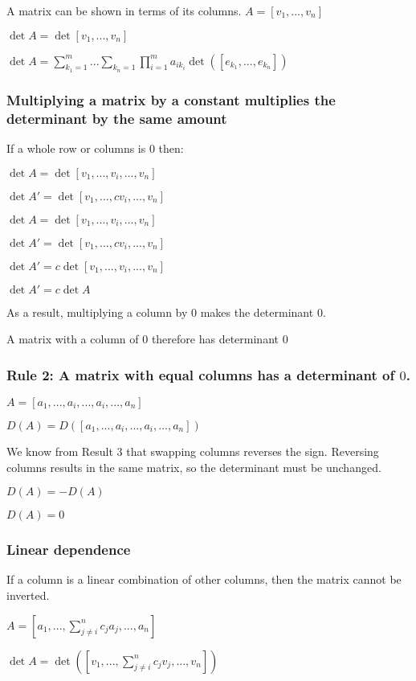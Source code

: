 A matrix can be shown in terms of its columns.
\(A=[v_1,...,v_n]\)

\(\det A=\det [v_1,...,v_n]\)


\(\det A=\sum_{k_1=1}^m...\sum_{k_n=1}\prod_{i=1}^ma_{ik_i}\det ([e_{k_1},...,e_{k_n}])\)

\subsubsection{Multiplying a matrix by a constant multiplies the determinant by the same amount}

If a whole row or columns is \(0\) then:

\(\det A=\det [v_1,...,v_i,...,v_n]\)

\(\det A'=\det [v_1,...,cv_i,...,v_n]\)


\(\det A=\det [v_1,...,v_i,...,v_n]\)

\(\det A'=\det [v_1,...,cv_i,...,v_n]\)

\(\det A'=c\det [v_1,...,v_i,...,v_n]\)

\(\det A'=c\det A\)

As a result, multiplying a column by \(0\) makes the determinant \(0\).

A matrix with a column of \(0\) therefore has determinant \(0\)

\subsubsection{Rule 2: A matrix with equal columns has a determinant of \(0\).}

\(A=[a_1,...,a_i,...,a_i,...,a_n]\)

\(D(A)=D([a_1,...,a_i,...,a_i,...,a_n])\)

We know from Result 3 that swapping columns reverses the sign. Reversing columns results in the same matrix, so the determinant must be unchanged.

\(D(A)=-D(A)\)

\(D(A)=0\)

\subsubsection{Linear dependence}

If a column is a linear combination of other columns, then the matrix cannot be inverted.

\(A=[a_1,...,\sum_{j\ne i}^{n}c_ja_j,...,a_n]\)

\(\det A=\det ([v_1,...,\sum_{j\ne i}^{n}c_jv_j,...,v_n])\)

